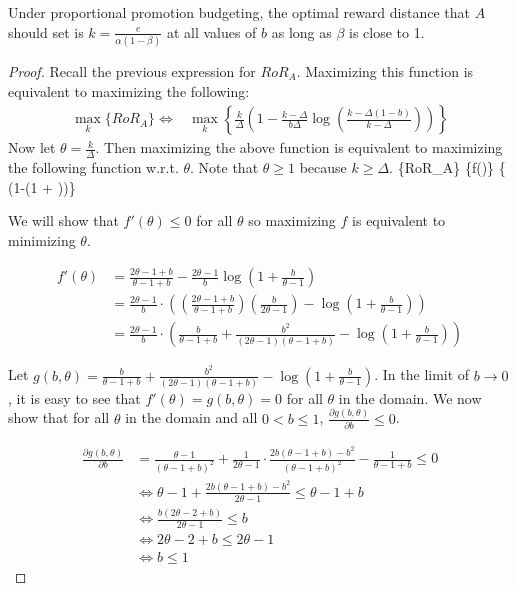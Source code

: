 \begin{theorem}
Under proportional promotion budgeting, the optimal reward distance that $A$ should set is $k = \frac{e}{\alpha(1-\beta)}$ at all values of $b$ as long as $\beta$ is close to 1.
\end{theorem}
\begin{proof}
Recall the previous expression for $RoR_A$. Maximizing this function is equivalent to maximizing the following:
\begin{align*}
\underset{k}\max\{RoR_A\} \Leftrightarrow & \underset{k} \max\left\{\frac{k}{\Delta}\left(1-\frac{k-\Delta}{b\Delta}\log\left(\frac{k-\Delta(1-b)}{k-\Delta}\right)\right)\right\}
\end{align*}
Now let $\theta = \frac{k}{\Delta}$. Then maximizing the above function is equivalent to maximizing the following function w.r.t. $\theta$. Note that $\theta \geq 1$ because $k \geq \Delta$.
\beq\notag
{}\max\{RoR_A\} \Leftrightarrow \underset{\theta}\max\{f(\theta)\} \Leftrightarrow \underset{\theta}\max\left\{ \theta \left(1-\log\left(1 + \right)\right)\right\} 
\eeq

We will show that $f'(\theta) \leq 0$ for all $\theta$ so maximizing $f$ is equivalent to minimizing $\theta$.

\begin{align*}
f'(\theta) &= \frac{2\theta-1+b}{\theta-1+b} - \frac{2\theta-1}{b} \log \left(1+\frac{b}{\theta-1} \right) \\
&= \frac{2\theta-1}{b}\cdot\left(\left(\frac{2\theta-1+b}{\theta-1+b}\right)\left(\frac{b}{2\theta-1} \right) - \log \left(1+\frac{b}{\theta-1} \right)\right) \\
&= \frac{2\theta-1}{b}\cdot\left(\frac{b}{\theta-1+b}+\frac{b^2}{(2\theta-1)(\theta-1+b)} - \log \left(1+\frac{b}{\theta-1} \right)\right)
\end{align*}

Let $g(b, \theta) = \frac{b}{\theta-1+b}+\frac{b^2}{(2\theta-1)(\theta-1+b)} - \log \left(1+\frac{b}{\theta-1} \right)$. 
In the limit of $b \to 0$, it is easy to see that $f'(\theta) = g(b, \theta) = 0$ for all $\theta$ in the domain. 
We now show that for all $\theta$ in the domain and all $0 < b \leq 1$, $\frac{\partial g(b, \theta)}{\partial b} \leq 0$.

\begin{align*}
\frac{\partial g(b,\theta)}{\partial b} &= \frac{\theta-1}{(\theta-1+b)^2}+\frac{1}{2\theta-1}\cdot \frac{2b(\theta-1+b)-b^2}{(\theta-1+b)^2} -\frac{1}{\theta-1+b} \leq 0 \\
&\iff \theta-1 + \frac{2b(\theta-1+b)-b^2}{2\theta-1} \leq \theta-1+b \\
&\iff \frac{b(2\theta-2+b)}{2\theta-1} \leq b \\
&\iff 2\theta-2+b \leq 2\theta-1 \\
&\iff b \leq 1
\end{align*}


\end{proof}
